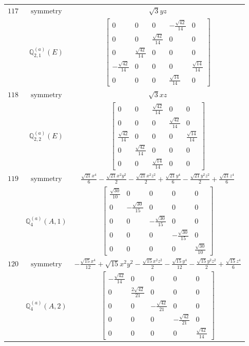 \documentclass[fleqn,8pt,landscape]{jsarticle}
\begin{document}
\begin{longtable}{ccc}
$ 117 $ & $ \text{symmetry} $ & $ \sqrt{3} y z $ \\
$  $ & $ \mathbb{Q}_{2,1}^{(a)}(E) $ & $ \begin{bmatrix} 0 & 0 & 0 & - \frac{\sqrt{42}}{14} & 0 \\ 0 & 0 & \frac{\sqrt{42}}{14} & 0 & 0 \\ 0 & \frac{\sqrt{42}}{14} & 0 & 0 & 0 \\ - \frac{\sqrt{42}}{14} & 0 & 0 & 0 & \frac{\sqrt{14}}{14} \\ 0 & 0 & 0 & \frac{\sqrt{14}}{14} & 0 \end{bmatrix} $ \\ \hline
$ 118 $ & $ \text{symmetry} $ & $ \sqrt{3} x z $ \\
$  $ & $ \mathbb{Q}_{2,2}^{(a)}(E) $ & $ \begin{bmatrix} 0 & 0 & \frac{\sqrt{42}}{14} & 0 & 0 \\ 0 & 0 & 0 & \frac{\sqrt{42}}{14} & 0 \\ \frac{\sqrt{42}}{14} & 0 & 0 & 0 & \frac{\sqrt{14}}{14} \\ 0 & \frac{\sqrt{42}}{14} & 0 & 0 & 0 \\ 0 & 0 & \frac{\sqrt{14}}{14} & 0 & 0 \end{bmatrix} $ \\ \hline
$ 119 $ & $ \text{symmetry} $ & $ \frac{\sqrt{21} x^{4}}{6} - \frac{\sqrt{21} x^{2} y^{2}}{2} - \frac{\sqrt{21} x^{2} z^{2}}{2} + \frac{\sqrt{21} y^{4}}{6} - \frac{\sqrt{21} y^{2} z^{2}}{2} + \frac{\sqrt{21} z^{4}}{6} $ \\
$  $ & $ \mathbb{Q}_{4}^{(a)}(A,1) $ & $ \begin{bmatrix} \frac{\sqrt{30}}{10} & 0 & 0 & 0 & 0 \\ 0 & - \frac{\sqrt{30}}{15} & 0 & 0 & 0 \\ 0 & 0 & - \frac{\sqrt{30}}{15} & 0 & 0 \\ 0 & 0 & 0 & - \frac{\sqrt{30}}{15} & 0 \\ 0 & 0 & 0 & 0 & \frac{\sqrt{30}}{10} \end{bmatrix} $ \\ \hline
$ 120 $ & $ \text{symmetry} $ & $ - \frac{\sqrt{15} x^{4}}{12} + \sqrt{15} x^{2} y^{2} - \frac{\sqrt{15} x^{2} z^{2}}{2} - \frac{\sqrt{15} y^{4}}{12} - \frac{\sqrt{15} y^{2} z^{2}}{2} + \frac{\sqrt{15} z^{4}}{6} $ \\
$  $ & $ \mathbb{Q}_{4}^{(a)}(A,2) $ & $ \begin{bmatrix} - \frac{\sqrt{42}}{14} & 0 & 0 & 0 & 0 \\ 0 & \frac{2 \sqrt{42}}{21} & 0 & 0 & 0 \\ 0 & 0 & - \frac{\sqrt{42}}{21} & 0 & 0 \\ 0 & 0 & 0 & - \frac{\sqrt{42}}{21} & 0 \\ 0 & 0 & 0 & 0 & \frac{\sqrt{42}}{14} \end{bmatrix} $ \\ \hline

\end{longtable}
\end{document}
